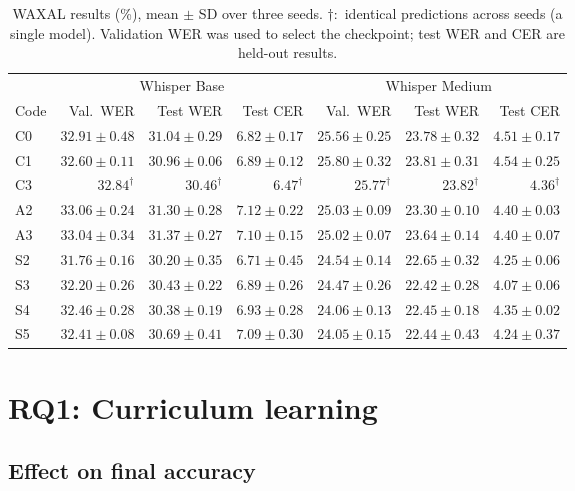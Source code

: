\documentclass[12pt,a4paper]{report}
\begin{document}
\begin{table}[htbp]\centering\scriptsize
\caption{WAXAL results (\%), mean $\pm$ SD over three seeds. $\dagger$:~identical
predictions across seeds (a single model). Validation WER was used to select the
checkpoint; test WER and CER are held-out results.}
\label{tab:waxal}
\setlength{\tabcolsep}{3pt}
\begin{tabular}{lrrrrrr}\toprule
 & \multicolumn{3}{c}{Whisper Base} & \multicolumn{3}{c}{Whisper Medium}\\
\cmidrule(lr){2-4}\cmidrule(lr){5-7}
Code & Val.\ WER & Test WER & Test CER & Val.\ WER & Test WER & Test CER\\\midrule
C0 & $32.91 \pm 0.48$ & $31.04 \pm 0.29$ & $6.82 \pm 0.17$ & $25.56 \pm 0.25$ & $23.78 \pm 0.32$ & $4.51 \pm 0.17$ \\
C1 & $32.60 \pm 0.11$ & $30.96 \pm 0.06$ & $6.89 \pm 0.12$ & $25.80 \pm 0.32$ & $23.81 \pm 0.31$ & $4.54 \pm 0.25$ \\
C3 & $32.84^{\dagger}$ & $30.46^{\dagger}$ & $6.47^{\dagger}$ & $25.77^{\dagger}$ & $23.82^{\dagger}$ & $4.36^{\dagger}$ \\
A2 & $33.06 \pm 0.24$ & $31.30 \pm 0.28$ & $7.12 \pm 0.22$ & $25.03 \pm 0.09$ & $23.30 \pm 0.10$ & $4.40 \pm 0.03$ \\
A3 & $33.04 \pm 0.34$ & $31.37 \pm 0.27$ & $7.10 \pm 0.15$ & $25.02 \pm 0.07$ & $23.64 \pm 0.14$ & $4.40 \pm 0.07$ \\
S2 & $31.76 \pm 0.16$ & $30.20 \pm 0.35$ & $6.71 \pm 0.45$ & $24.54 \pm 0.14$ & $22.65 \pm 0.32$ & $4.25 \pm 0.06$ \\
S3 & $32.20 \pm 0.26$ & $30.43 \pm 0.22$ & $6.89 \pm 0.26$ & $24.47 \pm 0.26$ & $22.42 \pm 0.28$ & $4.07 \pm 0.06$ \\
S4 & $32.46 \pm 0.28$ & $30.38 \pm 0.19$ & $6.93 \pm 0.28$ & $24.06 \pm 0.13$ & $22.45 \pm 0.18$ & $4.35 \pm 0.02$ \\
S5 & $32.41 \pm 0.08$ & $30.69 \pm 0.41$ & $7.09 \pm 0.30$ & $24.05 \pm 0.15$ & $22.44 \pm 0.43$ & $4.24 \pm 0.37$ \\
\bottomrule\end{tabular}
\end{table}

\section{RQ1: Curriculum learning}
\label{sec:rq1}

\subsection{Effect on final accuracy}
\end{document}
